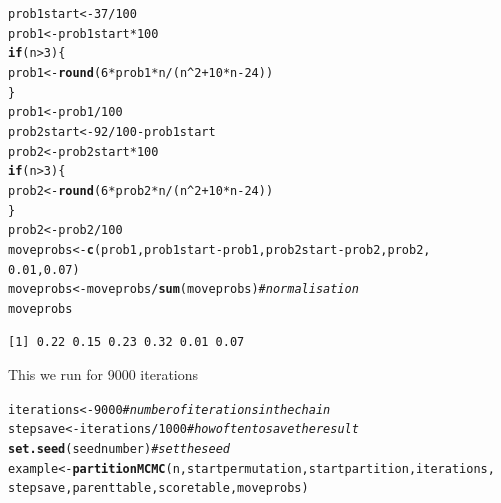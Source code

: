 \documentclass[a4paper]{article}\usepackage[]{graphicx}\usepackage[]{color}
\makeatletter
\newcommand{\hlnum}[1]{\textcolor[rgb]{0.686,0.059,0.569}{#1}}%
\newcommand{\hlcom}[1]{\textcolor[rgb]{0.678,0.584,0.686}{\textit{#1}}}%
\newcommand{\hlopt}[1]{\textcolor[rgb]{0,0,0}{#1}}%
\newcommand{\hlstd}[1]{\textcolor[rgb]{0.345,0.345,0.345}{#1}}%
\newcommand{\hlkwa}[1]{\textcolor[rgb]{0.161,0.373,0.58}{\textbf{#1}}}%
\newcommand{\hlkwb}[1]{\textcolor[rgb]{0.69,0.353,0.396}{#1}}%
\newcommand{\hlkwd}[1]{\textcolor[rgb]{0.737,0.353,0.396}{\textbf{#1}}}%
\newenvironment{kframe}{%
 \def\at@end@of@kframe{}%
 \ifinner\ifhmode%
  \def\at@end@of@kframe{\end{minipage}}%
  \begin{minipage}{\columnwidth}%
 \fi\fi%
 \def\FrameCommand##1{\hskip\@totalleftmargin \hskip-\fboxsep
 \colorbox{shadecolor}{##1}\hskip-\fboxsep
     \hskip-\linewidth \hskip-\@totalleftmargin \hskip\columnwidth}%
 \MakeFramed {\advance\hsize-\width
   \@totalleftmargin\z@ \linewidth\hsize
   \@setminipage}}%
 {\par\unskip\endMakeFramed%
 \at@end@of@kframe}
\newenvironment{knitrout}{}{} %
\newcommand{\nn}{\noindent}
\makeatother
\begin{document}
\begin{knitrout}
\color{fgcolor}\begin{kframe}
\begin{alltt}
\hlstd{prob1start} \hlkwb{<-} \hlnum{37}\hlopt{/}\hlnum{100}
\hlstd{prob1} \hlkwb{<-} \hlstd{prob1start} \hlopt{*} \hlnum{100}
\hlkwa{if} \hlstd{(n} \hlopt{>} \hlnum{3}\hlstd{) \{}
    \hlstd{prob1} \hlkwb{<-} \hlkwd{round}\hlstd{(}\hlnum{6} \hlopt{*} \hlstd{prob1} \hlopt{*} \hlstd{n}\hlopt{/}\hlstd{(n}\hlopt{^}\hlnum{2} \hlopt{+} \hlnum{10} \hlopt{*} \hlstd{n} \hlopt{-} \hlnum{24}\hlstd{))}
\hlstd{\}}
\hlstd{prob1} \hlkwb{<-} \hlstd{prob1}\hlopt{/}\hlnum{100}
\hlstd{prob2start} \hlkwb{<-} \hlnum{92}\hlopt{/}\hlnum{100} \hlopt{-} \hlstd{prob1start}
\hlstd{prob2} \hlkwb{<-} \hlstd{prob2start} \hlopt{*} \hlnum{100}
\hlkwa{if} \hlstd{(n} \hlopt{>} \hlnum{3}\hlstd{) \{}
    \hlstd{prob2} \hlkwb{<-} \hlkwd{round}\hlstd{(}\hlnum{6} \hlopt{*} \hlstd{prob2} \hlopt{*} \hlstd{n}\hlopt{/}\hlstd{(n}\hlopt{^}\hlnum{2} \hlopt{+} \hlnum{10} \hlopt{*} \hlstd{n} \hlopt{-} \hlnum{24}\hlstd{))}
\hlstd{\}}
\hlstd{prob2} \hlkwb{<-} \hlstd{prob2}\hlopt{/}\hlnum{100}
\hlstd{moveprobs} \hlkwb{<-} \hlkwd{c}\hlstd{(prob1, prob1start} \hlopt{-} \hlstd{prob1, prob2start} \hlopt{-} \hlstd{prob2, prob2,}
    \hlnum{0.01}\hlstd{,} \hlnum{0.07}\hlstd{)}
\hlstd{moveprobs} \hlkwb{<-} \hlstd{moveprobs}\hlopt{/}\hlkwd{sum}\hlstd{(moveprobs)}  \hlcom{# normalisation}
\hlstd{moveprobs}
\end{alltt}
\begin{verbatim}
[1] 0.22 0.15 0.23 0.32 0.01 0.07
\end{verbatim}
\end{kframe}
\end{knitrout}

\nn This we run for 9000 iterations

\begin{knitrout}
\color{fgcolor}\begin{kframe}
\begin{alltt}
\hlstd{iterations} \hlkwb{<-} \hlnum{9000}  \hlcom{#number of iterations in the chain}
\hlstd{stepsave} \hlkwb{<-} \hlstd{iterations}\hlopt{/}\hlnum{1000}  \hlcom{#how often to save the result}
\hlkwd{set.seed}\hlstd{(seednumber)}  \hlcom{# set the seed}
\hlstd{example} \hlkwb{<-} \hlkwd{partitionMCMC}\hlstd{(n, startpermutation, startpartition, iterations,}
    \hlstd{stepsave, parenttable, scoretable, moveprobs)}
\end{alltt}
\end{kframe}
\end{knitrout}
\end{document}
